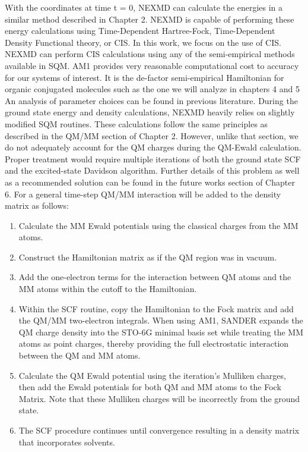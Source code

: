 With the coordinates at time t = 0, NEXMD can calculate the energies in
a similar method described in Chapter 2. NEXMD is capable of
performing these energy calculations using Time-Dependent
Hartree-Fock, Time-Dependent Density Functional theory, or CIS. In
this work, we focus on the use of CIS. NEXMD can perform CIS
calculations using any of the semi-empirical methods available in SQM.
AM1 provides very reasonable computational cost to accuracy for our
systems of interest. It is the de-factor semi-empirical Hamiltonian
for organic conjugated molecules such as the one we will analyze in
chapters 4 and 5 \cite{silva2010benchmark} An analysis of parameter
choices can be found in previous
literature.\cite{nelson2012nonadiabatic} During the ground state
energy and density calculations, NEXMD heavily relies on slightly
modified SQM routines. These calculations follow the same principles
as described in the QM/MM section of Chapter 2. However,
unlike that section, we do not adequately account for the QM charges
during the QM-Ewald calculation. Proper treatment would require
multiple iterations of both the ground state SCF and the excited-state
Davidson algorithm. Further details of this problem as well as a
recommended solution can be found in the future works section of
Chapter 6. \cite{Walker2008} For a general time-step QM/MM interaction
will be added to the density matrix as follows:
\begin{enumerate}
\item Calculate the MM Ewald potentials using the classical charges
  from the MM atoms.
\item Construct the Hamiltonian matrix as if the QM region was in
  vacuum.
\item Add the one-electron terms for the interaction between QM
  atoms and the MM atoms within the cutoff to the Hamiltonian.
\item Within the SCF routine, copy the Hamiltonian to the Fock
  matrix and add the QM/MM two-electron integrals. When using AM1,
  SANDER expands the QM charge density into the STO-6G minimal
  basis set while treating the MM atoms as point charges, thereby
  providing the full electrostatic interaction between the QM and
  MM atoms.
\item Calculate the QM Ewald potential using the iteration’s
  Mulliken charges, then add the Ewald potentials for both QM and
  MM atoms to the Fock Matrix. Note that these Mulliken charges will be incorrectly from the ground state.
\item The SCF procedure continues until convergence resulting in a
  density matrix that incorporates solvents.
\end{enumerate}

